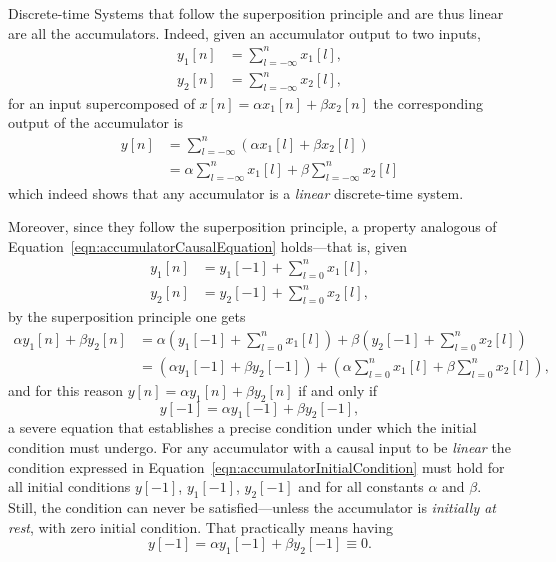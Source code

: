 \documentclass[\documentfontsize, twocolumn]{\classname}
\begin{document}
Discrete-time Systems that follow the superposition principle and are thus linear are all the accumulators. Indeed, given an accumulator output to two inputs,
\begin{align*}
    y_1[n] &= \sum_{l=-\infty}^n x_1[l], \\
    y_2[n] &= \sum_{l=-\infty}^n x_2[l],
\end{align*}
for an input supercomposed of $x[n] = \alpha x_1[n] + \beta x_2[n]$ the corresponding output of the accumulator is
\begin{align*}
    y[n] &= \sum_{l=-\infty}^n (\alpha x_1[l] + \beta x_2[l]) \\
         &= \alpha\sum_{l=-\infty}^n x_1[l] + \beta\sum_{l=-\infty}^n x_2[l]
\end{align*}
which indeed shows that any accumulator is a \emph{linear} discrete-time system.

Moreover, since they follow the superposition principle, a property analogous of Equation~\ref{eqn:accumulatorCausalEquation} holds---that is, given
\begin{align*}
    y_1[n] &= y_1[-1] + \sum_{l=0}^n x_1[l], \\
    y_2[n] &= y_2[-1] + \sum_{l=0}^n x_2[l],
\end{align*}
by the superposition principle one gets
\begin{align*}
    \alpha y_1[n] + \beta y_2[n]  &= \alpha ( y_1[-1] + \sum_{l=0}^n x_1[l]) + \beta ( y_2[-1] + \sum_{l=0}^n x_2[l])\\
                                  &= (\alpha y_1[-1] + \beta y_2[-1]) + (\alpha\sum_{l=0}^n x_1[l] + \beta\sum_{l=0}^n x_2[l]),
\end{align*}
and for this reason $y[n] = \alpha y_1[n] + \beta y_2[n]$ if and only if
\begin{equation}\label{eqn:accumulatorInitialCondition}
    y[-1] = \alpha y_1[-1] + \beta y_2[-1],
\end{equation}
a severe equation that establishes a precise condition under which the initial condition must undergo. For any accumulator with a causal input to be \emph{linear} the condition expressed in Equation~\ref{eqn:accumulatorInitialCondition} must hold for all initial conditions $y[-1]$, $y_1[-1]$, $y_2[-1]$ and for all constants $\alpha$ and $\beta$. Still, the condition can never be satisfied---unless the accumulator is \emph{initially at rest}, with zero initial condition. That practically means having
\[
    y[-1] = \alpha y_1[-1] + \beta y_2[-1] \equiv 0.
\]
\end{document}

